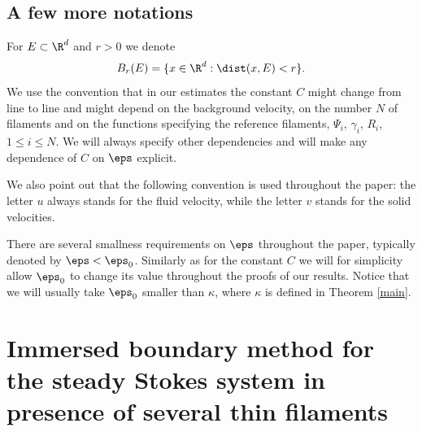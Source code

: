 \subsection{A few more notations}
For $E \subset \R^d$ and $r>0$ we denote
\begin{equation}
B_r(E) = \{ x \in \R^d : \dist(x,E) < r \}.
\end{equation}
We use the convention that in our estimates the constant $C$ might change from line to line and might depend on the background velocity, on the number $N$ of filaments and on the functions specifying the reference filaments, \ie $\Psi_i$, $\gamma_i$, $R_i$, $1 \leq i \leq N$.
We will always specify other dependencies and will make any dependence of $C$ on $\eps$ explicit.

We also point out that the following convention is used throughout the paper: the letter $u$ always stands for the fluid velocity, while the letter $v$ stands for the solid velocities.

There are several smallness requirements on $\eps$ throughout the paper, typically denoted by $\eps < \eps_0$. Similarly as for the constant $C$ we will for simplicity
allow $\eps_0$ to change its value throughout the proofs of our results. Notice that we will usually take $\eps_0$ smaller than $\kappa$, where $\kappa$ is defined in Theorem \ref{main}.

\section{Immersed boundary method for the steady Stokes system in presence of several thin filaments}
\label{sec:singularity.method}

